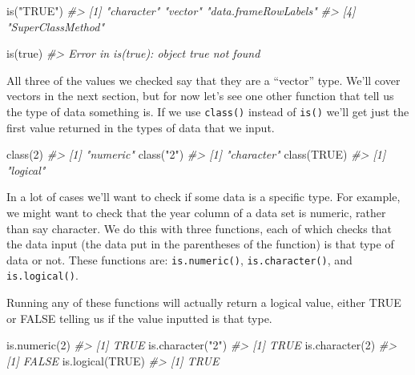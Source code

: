 \documentclass[
]{krantz}
\makeatletter
\newenvironment{Shaded}{\begin{snugshade}}{\end{snugshade}}
\newcommand{\CommentTok}[1]{\textcolor[rgb]{0.37,0.37,0.37}{\textit{#1}}}
\newcommand{\ConstantTok}[1]{\textcolor[rgb]{0,0,0}{#1}}
\newcommand{\DecValTok}[1]{\textcolor[rgb]{0.06,0.06,0.06}{#1}}
\newcommand{\FunctionTok}[1]{\textcolor[rgb]{0,0,0}{#1}}
\newcommand{\NormalTok}[1]{#1}
\newcommand{\StringTok}[1]{\textcolor[rgb]{0.5,0.5,0.5}{#1}}
\newenvironment{kframe}{%
\medskip{}
\setlength{\fboxsep}{.8em}
 \def\at@end@of@kframe{}%
 \ifinner\ifhmode%
  \def\at@end@of@kframe{\end{minipage}}%
  \begin{minipage}{\columnwidth}%
 \fi\fi%
 \def\FrameCommand##1{\hskip\@totalleftmargin \hskip-\fboxsep
 \colorbox{shadecolor}{##1}\hskip-\fboxsep
     \hskip-\linewidth \hskip-\@totalleftmargin \hskip\columnwidth}%
 \MakeFramed {\advance\hsize-\width
   \@totalleftmargin\z@ \linewidth\hsize
   \@setminipage}}%
 {\par\unskip\endMakeFramed%
 \at@end@of@kframe}
\renewenvironment{Shaded}{\begin{kframe}}{\end{kframe}}
\makeatother
\begin{document}
\begin{Shaded}
\begin{Highlighting}[]
\FunctionTok{is}\NormalTok{(}\StringTok{"TRUE"}\NormalTok{)}
\CommentTok{\#\textgreater{} [1] "character"           "vector"              "data.frameRowLabels"}
\CommentTok{\#\textgreater{} [4] "SuperClassMethod"}
\end{Highlighting}
\end{Shaded}

\begin{Shaded}
\begin{Highlighting}[]
\FunctionTok{is}\NormalTok{(true)}
\CommentTok{\#\textgreater{} Error in is(true): object \textquotesingle{}true\textquotesingle{} not found}
\end{Highlighting}
\end{Shaded}

All three of the values we checked say that they are a ``vector'' type. We'll cover vectors in the next section, but for now let's see one other function that tell us the type of data something is. If we use \texttt{class()} instead of \texttt{is()} we'll get just the first value returned in the types of data that we input.

\begin{Shaded}
\begin{Highlighting}[]
\FunctionTok{class}\NormalTok{(}\DecValTok{2}\NormalTok{)}
\CommentTok{\#\textgreater{} [1] "numeric"}
\FunctionTok{class}\NormalTok{(}\StringTok{"2"}\NormalTok{)}
\CommentTok{\#\textgreater{} [1] "character"}
\FunctionTok{class}\NormalTok{(}\ConstantTok{TRUE}\NormalTok{)}
\CommentTok{\#\textgreater{} [1] "logical"}
\end{Highlighting}
\end{Shaded}

In a lot of cases we'll want to check if some data is a specific type. For example, we might want to check that the year column of a data set is numeric, rather than say character. We do this with three functions, each of which checks that the data input (the data put in the parentheses of the function) is that type of data or not. These functions are: \texttt{is.numeric()}, \texttt{is.character()}, and \texttt{is.logical()}.

Running any of these functions will actually return a logical value, either TRUE or FALSE telling us if the value inputted is that type.

\begin{Shaded}
\begin{Highlighting}[]
\FunctionTok{is.numeric}\NormalTok{(}\DecValTok{2}\NormalTok{)}
\CommentTok{\#\textgreater{} [1] TRUE}
\FunctionTok{is.character}\NormalTok{(}\StringTok{"2"}\NormalTok{)}
\CommentTok{\#\textgreater{} [1] TRUE}
\FunctionTok{is.character}\NormalTok{(}\DecValTok{2}\NormalTok{)}
\CommentTok{\#\textgreater{} [1] FALSE}
\FunctionTok{is.logical}\NormalTok{(}\ConstantTok{TRUE}\NormalTok{)}
\CommentTok{\#\textgreater{} [1] TRUE}
\end{Highlighting}
\end{Shaded}
\end{document}
